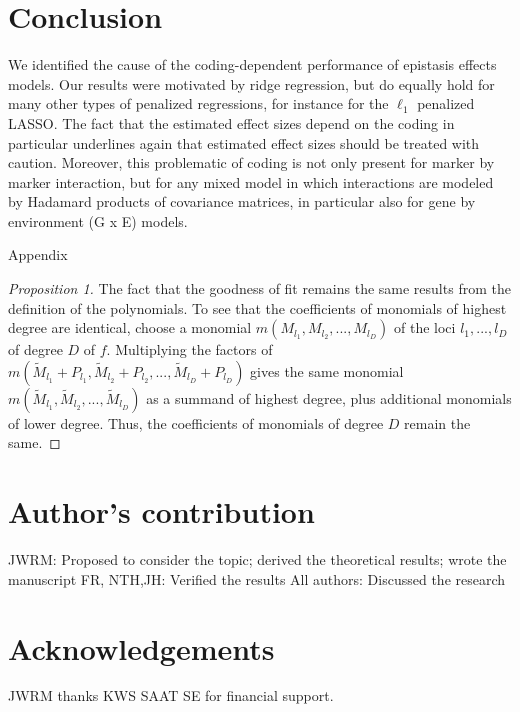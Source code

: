 \documentclass{bmcart}
\newcommand{\0}{\mathbf{0}}
\begin{document}
\section*{Conclusion}
We identified the cause of the coding-dependent performance of epistasis effects models. Our results were motivated by ridge regression, but do equally hold for many other types of penalized regressions, for instance for the $\ell_1$ penalized LASSO. The fact that the estimated effect sizes depend on the coding in particular underlines again that estimated effect sizes should be treated with caution. Moreover, this problematic of coding is not only present for marker by marker interaction, but for any mixed model in which interactions are modeled by Hadamard products of covariance matrices, in particular also for gene by environment (G x E) models.



\newpage
\begin{center} {\huge Appendix } \end{center}
\vspace{0.5cm}
\begin{proof}[Proposition 1]
	The fact that the goodness of fit remains the same results from the definition of the polynomials. To see that the coefficients of monomials of highest degree are identical, choose a monomial $m(M_{l_1},M_{l_2},...,M_{l_D})$ of the loci $l_1,...,l_D$ of degree $D$ of $f$. Multiplying the factors of $m(\tilde{M}_{l_1}+P_{l_1},\tilde{M}_{l_2}+P_{l_2},...,\tilde{M}_{l_D}+P_{l_D})$ gives the same monomial 
	$m(\tilde{M}_{l_1},\tilde{M}_{l_2},...,\tilde{M}_{l_D})$ as a summand of highest degree, plus additional monomials of lower degree. Thus, the coefficients of monomials of degree $D$ remain the same. 
\end{proof}
\section*{Author's contribution}
JWRM: Proposed to consider the topic; derived the theoretical results; wrote the manuscript
FR, NTH,JH: Verified the results
All authors: Discussed the research



\section*{Acknowledgements}
JWRM thanks KWS SAAT SE for financial support.
\end{document}
